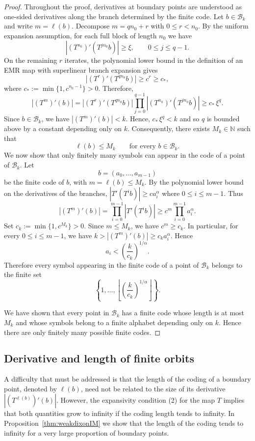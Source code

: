 \documentclass[letterpaper,11pt]{amsart}
\numberwithin{equation}{section}     %
\def\le{\leqslant}
\def\ge{\geqslant}
\begin{document}
\begin{proof}
Throughout the proof, derivatives at boundary points are understood as
one-sided derivatives along the branch determined by the finite code. Let $b\in\mathcal B_k$ and write $m=\ell(b)$. Decompose $m=q n_0+r$ with  $0\le r<n_0$. By the uniform expansion assumption, for each full block of length $n_0$ we have
\[
\left|(T^{n_0})'(T^{j n_0}b)\right|\ge \xi,
\qquad 0\le j\le q-1.
\]
On the remaining $r$ iterates, the polynomial lower bound in the definition of
an EMR map with superlinear branch expansion gives
\[
\left|(T^r)'(T^{q n_0}b)\right|
\ge c^r
\ge c_*,
\]
where $c_*:=\min\{1,c^{n_0-1}\}>0. $ Therefore,
\[
\left|(T^m)'(b)\right|
=
\left|(T^r)'(T^{q n_0}b)\right|
\prod_{j=0}^{q-1}
\left|(T^{n_0})'(T^{j n_0}b)\right|
\ge c_*\,\xi^q.
\]
Since $b\in\mathcal B_k$, we have $\left|(T^m)'(b)\right|<k$. Hence, $c_*\,\xi^q<k$ and so $q$ is bounded above by a constant depending only on $k$. Consequently,
there exists $M_k\in\mathbb N$ such that
\[
\ell(b)\le M_k
\qquad
\text{for every } b\in\mathcal B_k.
\]
We now show that only finitely many symbols can appear in the code of a point
of $\mathcal B_k$. Let
\[
b=(a_0,\ldots,a_{m-1})
\]
be the finite code of $b$, with $m=\ell(b)\le M_k$. By the polynomial lower bound on the derivatives of the branches,
$|T'(T^i b)|\ge c a_i^\alpha$ where $0\le i\le m-1$. Thus
\[
\left|(T^m)'(b)\right|
=
\prod_{i=0}^{m-1}|T'(T^i b)|
\ge
c^m\prod_{i=0}^{m-1}a_i^\alpha.
\]
Set $c_k:=\min\{1,c^{M_k}\}>0.$
Since $m\le M_k$, we have $c^m\ge c_k$. In particular, for every
$0\le i\le m-1$, we have $k> \left|(T^m)'(b)\right| \ge
c_k a_i^\alpha. $ Hence
\[
a_i
<
\left(\frac{k}{c_k}\right)^{1/\alpha}.
\]
Therefore every symbol appearing in the finite code of a point of
$\mathcal B_k$ belongs to the finite set
\[
\left\{
1,\ldots,
\left\lfloor
\left(\frac{k}{c_k}\right)^{1/\alpha}
\right\rfloor
\right\}.
\]

We have shown that every point in $\mathcal B_k$ has a finite code whose
length is at most $M_k$ and whose symbols belong to a finite alphabet depending
only on $k$. Hence there are only finitely many possible finite codes. 
\end{proof}





\subsection{Derivative and length of finite orbits} 
A difficulty that must be addressed is that the length of the coding of a boundary point, denoted by $\ell(b)$, need not be related to the size of its derivative $|(T^{\ell(b)})'(b)|$. However, the expansivity condition (2) for the map $T$ implies that both quantities grow to infinity if the coding length tends to infinity. In Proposition~\ref{thm:weakdixonIM} we show that the length of the coding tends to infinity for a very large proportion of boundary points. 
\end{document}
